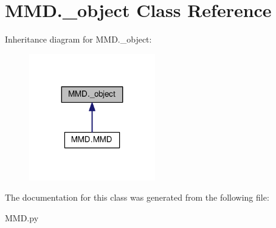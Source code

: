 \hypertarget{classMMD_1_1__object}{}\section{M\+M\+D.\+\_\+object Class Reference}
\label{classMMD_1_1__object}


Inheritance diagram for M\+M\+D.\+\_\+object\+:
\nopagebreak
\begin{figure}[H]
\begin{center}
\leavevmode
\includegraphics[width=155pt]{classMMD_1_1__object__inherit__graph}
\end{center}
\end{figure}


The documentation for this class was generated from the following file\+:\begin{DoxyCompactItemize}
\item 
M\+M\+D.\+py\end{DoxyCompactItemize}

